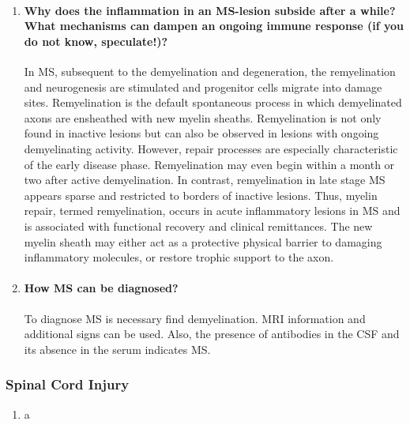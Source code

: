 \documentclass[12pt,article,oneside,a4paper]{memoir}
\begin{document}
\begin{enumerate}
\item \paragraph{Why does the inflammation in an MS-lesion subside after a while?
What mechanisms can dampen an ongoing immune response (if you do not know,
speculate!)?}

In MS, subsequent to the demyelination and degeneration, the remyelination and
neurogenesis are stimulated and progenitor cells migrate into damage sites.
Remyelination is the default spontaneous process in which demyelinated axons
are ensheathed with new myelin sheaths.
Remyelination is not only found in inactive lesions but can also be observed in
lesions with ongoing demyelinating activity. However, repair processes are
especially characteristic of the early disease phase. Remyelination may even
begin within a month or two after active demyelination. In contrast,
remyelination in late stage MS appears sparse and restricted to borders of
inactive lesions. Thus, myelin repair, termed remyelination, occurs in acute
inflammatory lesions in MS and is associated with functional recovery and
clinical remittances. The new myelin sheath may either act as a protective
physical barrier to damaging inflammatory molecules, or restore trophic support
to the axon.

\item \paragraph{How MS can be diagnosed?}
To diagnose MS is necessary find demyelination. MRI information and additional
signs can be used. Also, the presence of antibodies in the CSF and its absence
in the serum indicates MS.

\end{enumerate}


\subsubsection{Spinal Cord Injury}
\begin{enumerate}
\item a 
\end{enumerate}
\end{document}
